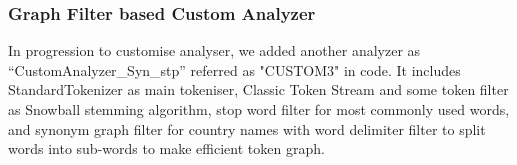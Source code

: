 \subsubsection{Graph Filter based Custom Analyzer}\hfill
\newline
In progression to customise analyser, we added another analyzer as “CustomAnalyzer\_Syn\_stp” referred as "CUSTOM3" in code. It includes StandardTokenizer\cite{StandardTokenizer} as  main tokeniser, Classic Token Stream and some token filter as Snowball\cite{snowball_filter} stemming algorithm, stop word filter for most commonly used words, and synonym graph filter for country names with word delimiter filter to split words into sub-words to make efficient token graph.


